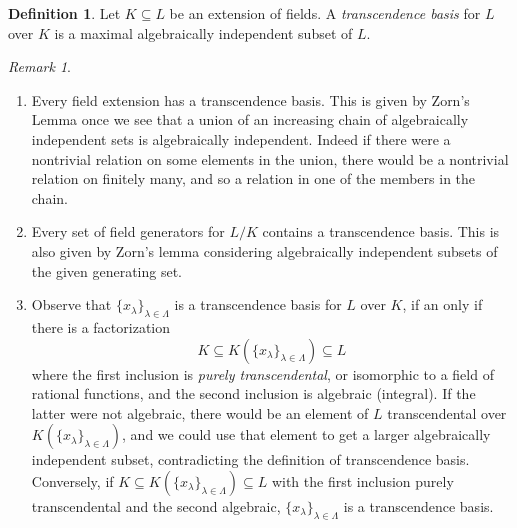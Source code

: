 \documentclass{amsart}[12pt]
\numberwithin{equation}{section}
\theoremstyle{plain} %
\theoremstyle{definition}
\newtheorem{definition}[equation]{Definition}
\theoremstyle{remark}
\newtheorem{rem}[equation]{Remark}
\begin{document}
\begin{definition} Let $K\subseteq L$ be an extension of fields. A \emph{transcendence basis} for $L$ over $K$ is a maximal algebraically independent subset of $L$.
	\end{definition}

\begin{rem}
\label{rem:trbasis}
\begin{enumerate}
\item Every field extension has a transcendence basis. This is given by Zorn's Lemma once we see that a union of an increasing chain of algebraically independent sets is algebraically independent. Indeed  if there were a nontrivial relation on some elements in the union, there would be a nontrivial relation on finitely many, and so a relation in one of the members in the chain.
\item Every set of field generators for $L/K$ contains a transcendence basis. This is also given by Zorn's lemma considering algebraically independent subsets of the given generating set.
\item Observe that $\{x_\lambda\}_{\lambda\in \Lambda}$ is a transcendence basis for $L$ over $K$, if an only if there is a factorization
\[ K \subseteq K(\{x_\lambda\}_{\lambda\in \Lambda}) \subseteq L\]
where the first inclusion is \emph{purely transcendental}, or isomorphic to a field of rational functions, and the second inclusion is algebraic (integral). If the latter were not algebraic, there would be an element of $L$ transcendental over $K(\{x_\lambda\}_{\lambda\in \Lambda})$, and we could use that element to get a larger algebraically independent subset, contradicting the definition of transcendence basis. Conversely, if $K \subseteq K(\{x_\lambda\}_{\lambda\in \Lambda}) \subseteq L$ with the first inclusion purely transcendental and the second algebraic, $\{x_\lambda\}_{\lambda\in \Lambda}$ is a transcendence basis.
\end{enumerate}
\end{rem}
\end{document}
